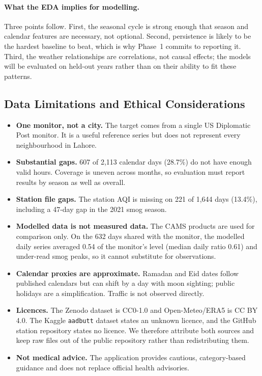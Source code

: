 \paragraph{What the EDA implies for modelling.}
Three points follow. First, the seasonal cycle is strong enough that season and calendar features are necessary, not optional. Second, persistence is likely to be the hardest baseline to beat, which is why Phase~1 commits to reporting it. Third, the weather relationships are correlations, not causal effects; the models will be evaluated on held-out years rather than on their ability to fit these patterns.

\subsection{Data Limitations and Ethical Considerations}

\begin{itemize}
  \item \textbf{One monitor, not a city.} The target comes from a single US Diplomatic Post monitor. It is a useful reference series but does not represent every neighbourhood in Lahore.
  \item \textbf{Substantial gaps.} 607 of 2{,}113 calendar days (28.7\%) do not have enough valid hours. Coverage is uneven across months, so evaluation must report results by season as well as overall.
  \item \textbf{Station file gaps.} The station AQI is missing on 221 of 1{,}644 days (13.4\%), including a 47-day gap in the 2021 smog season.
  \item \textbf{Modelled data is not measured data.} The CAMS products are used for comparison only. On the 632 days shared with the monitor, the modelled daily series averaged 0.54 of the monitor's level (median daily ratio 0.61) and under-read smog peaks, so it cannot substitute for observations.
  \item \textbf{Calendar proxies are approximate.} Ramadan and Eid dates follow published calendars but can shift by a day with moon sighting; public holidays are a simplification. Traffic is not observed directly.
  \item \textbf{Licences.} The Zenodo dataset is CC0-1.0 and Open-Meteo/ERA5 is CC BY 4.0. The Kaggle \texttt{aadbutt} dataset states an unknown licence, and the GitHub station repository states no licence. We therefore attribute both sources and keep raw files out of the public repository rather than redistributing them.
  \item \textbf{Not medical advice.} The application provides cautious, category-based guidance and does not replace official health advisories.
\end{itemize}
